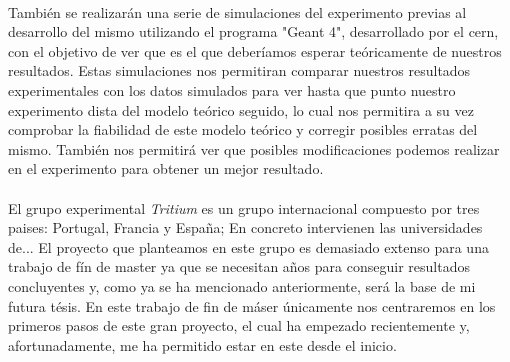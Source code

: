 \documentclass[11pt, a4paper]{article}
\begin{document}
\paragraph {}
También se realizarán una serie de simulaciones del experimento previas al desarrollo del mismo utilizando el programa "Geant 4", desarrollado por el cern, con el objetivo de ver que es el que deberíamos esperar teóricamente de nuestros resultados. Estas simulaciones nos permitiran comparar nuestros resultados experimentales con los datos simulados para ver hasta que punto nuestro experimento dista del modelo teórico seguido, lo cual nos permitira a su vez comprobar la fiabilidad de este modelo teórico y corregir posibles erratas del mismo. También nos permitirá ver que posibles modificaciones podemos realizar en el experimento para obtener un mejor resultado.

\paragraph {}
El grupo experimental \textit{Tritium} es un grupo internacional compuesto por tres paises: Portugal, Francia y España; En concreto intervienen las universidades de...  El proyecto que planteamos en este grupo es demasiado extenso para una trabajo de fín de master ya que se necesitan años para conseguir resultados concluyentes y, como ya se ha mencionado anteriormente, será la base de mi futura tésis. En este trabajo de fin de máser únicamente nos centraremos en los primeros pasos de este gran proyecto, el cual ha empezado recientemente y, afortunadamente, me ha permitido estar en este desde el inicio.
\end{document}
